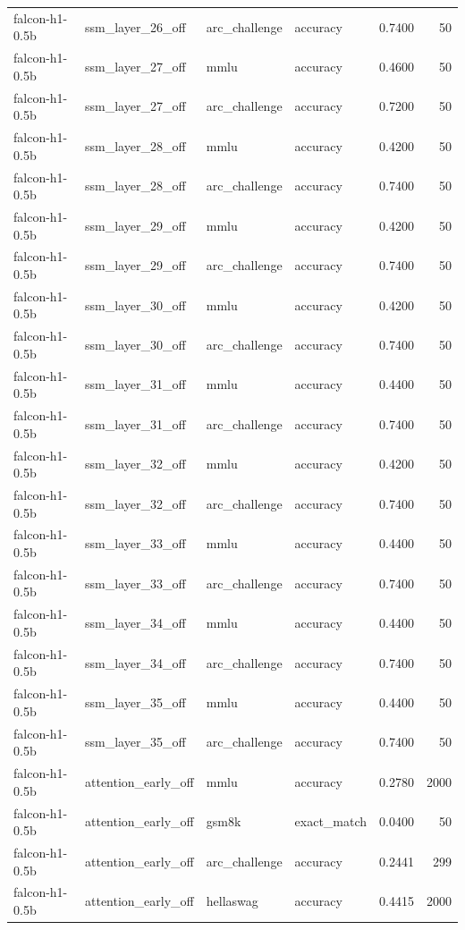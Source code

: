 \begin{tabular}{llllrr}
falcon-h1-0.5b & ssm_layer_26_off & arc_challenge & accuracy & 0.7400 & 50 \\
falcon-h1-0.5b & ssm_layer_27_off & mmlu & accuracy & 0.4600 & 50 \\
falcon-h1-0.5b & ssm_layer_27_off & arc_challenge & accuracy & 0.7200 & 50 \\
falcon-h1-0.5b & ssm_layer_28_off & mmlu & accuracy & 0.4200 & 50 \\
falcon-h1-0.5b & ssm_layer_28_off & arc_challenge & accuracy & 0.7400 & 50 \\
falcon-h1-0.5b & ssm_layer_29_off & mmlu & accuracy & 0.4200 & 50 \\
falcon-h1-0.5b & ssm_layer_29_off & arc_challenge & accuracy & 0.7400 & 50 \\
falcon-h1-0.5b & ssm_layer_30_off & mmlu & accuracy & 0.4200 & 50 \\
falcon-h1-0.5b & ssm_layer_30_off & arc_challenge & accuracy & 0.7400 & 50 \\
falcon-h1-0.5b & ssm_layer_31_off & mmlu & accuracy & 0.4400 & 50 \\
falcon-h1-0.5b & ssm_layer_31_off & arc_challenge & accuracy & 0.7400 & 50 \\
falcon-h1-0.5b & ssm_layer_32_off & mmlu & accuracy & 0.4200 & 50 \\
falcon-h1-0.5b & ssm_layer_32_off & arc_challenge & accuracy & 0.7400 & 50 \\
falcon-h1-0.5b & ssm_layer_33_off & mmlu & accuracy & 0.4400 & 50 \\
falcon-h1-0.5b & ssm_layer_33_off & arc_challenge & accuracy & 0.7400 & 50 \\
falcon-h1-0.5b & ssm_layer_34_off & mmlu & accuracy & 0.4400 & 50 \\
falcon-h1-0.5b & ssm_layer_34_off & arc_challenge & accuracy & 0.7400 & 50 \\
falcon-h1-0.5b & ssm_layer_35_off & mmlu & accuracy & 0.4400 & 50 \\
falcon-h1-0.5b & ssm_layer_35_off & arc_challenge & accuracy & 0.7400 & 50 \\
falcon-h1-0.5b & attention_early_off & mmlu & accuracy & 0.2780 & 2000 \\
falcon-h1-0.5b & attention_early_off & gsm8k & exact_match & 0.0400 & 50 \\
falcon-h1-0.5b & attention_early_off & arc_challenge & accuracy & 0.2441 & 299 \\
falcon-h1-0.5b & attention_early_off & hellaswag & accuracy & 0.4415 & 2000 \\

\end{tabular}
